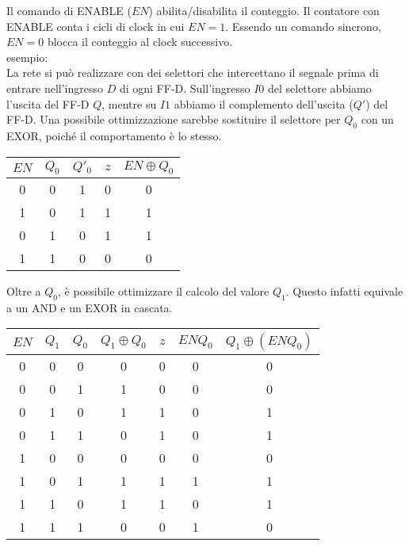 \documentclass{subfiles}
\begin{document}
Il comando di ENABLE ($EN$) abilita/disabilita il conteggio.
Il contatore con ENABLE conta i cicli di clock in cui $EN=1$.
Essendo un comando sincrono, $EN=0$ blocca il conteggio al clock successivo.\\

\noindent
esempio:\\

\noindent
La rete si può realizzare con dei selettori che intercettano il segnale prima di entrare nell'ingresso $D$ di ogni FF-D.
Sull'ingresso $I0$ del selettore abbiamo l'uscita del FF-D $Q$, mentre su $I1$ abbiamo il complemento dell'uscita ($Q'$) del FF-D.
Una possibile ottimizzazione sarebbe sostituire il selettore per $Q_0$ con un EXOR, poiché il comportamento è lo stesso.

\begin{center}
\begin{tabular}{ |c|c|c|c|c| }
\hline
$EN$ & $Q_0$ & $Q'_0$ & $z$ & $EN \oplus Q_0$ \\
\hline
\hline
0 & 0 & 1 & 0 & 0 \\
1 & 0 & 1 & 1 & 1 \\
0 & 1 & 0 & 1 & 1 \\
1 & 1 & 0 & 0 & 0 \\
\hline
\end{tabular}
\end{center}

\noindent
Oltre a $Q_0$, è possibile ottimizzare il calcolo del valore $Q_1$.
Questo infatti equivale a un AND e un EXOR in cascata.

\begin{center}
\begin{tabular}{ |c|c|c|c|c|c|c| }
\hline
$EN$ & $Q_1$ & $Q_0$ & $Q_1 \oplus Q_0$ & $z$ & $EN Q_0$ & $Q_1 \oplus (EN Q_0)$ \\
\hline
\hline
0 & 0 & 0 & 0 & 0 & 0 & 0 \\
0 & 0 & 1 & 1 & 0 & 0 & 0 \\
0 & 1 & 0 & 1 & 1 & 0 & 1 \\
0 & 1 & 1 & 0 & 1 & 0 & 1 \\
1 & 0 & 0 & 0 & 0 & 0 & 0 \\
1 & 0 & 1 & 1 & 1 & 1 & 1 \\
1 & 1 & 0 & 1 & 1 & 0 & 1 \\
1 & 1 & 1 & 0 & 0 & 1 & 0 \\
\hline
\end{tabular}
\end{center}
\end{document}
